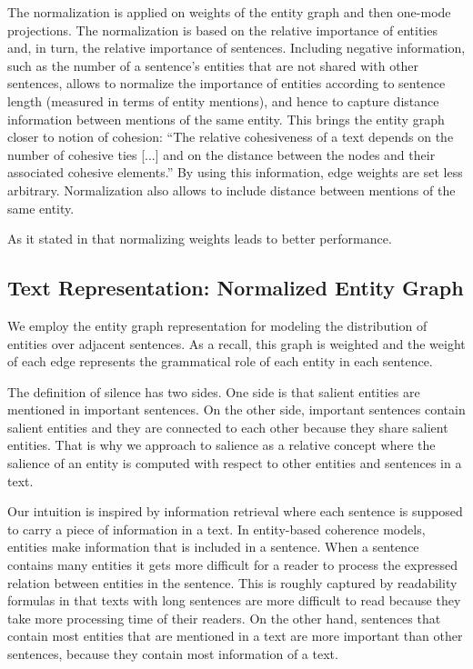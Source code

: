The normalization is applied on weights of the entity graph and then one-mode projections. 
The normalization is based on the relative importance of entities and, in turn, the relative importance of sentences. 
Including negative information, such as the number of a sentence's entities that are not shared with other sentences, allows to normalize the importance of entities according to sentence length (measured in terms
of entity mentions), and hence to capture distance information between mentions of the same entity.
This brings the entity graph closer to  notion of cohesion: ``The relative cohesiveness of a text depends on the number of cohesive ties [...] and on the distance between the nodes and their associated cohesive elements.” By using this information, edge weights are set less arbitrary. 
Normalization also allows to include distance between mentions of the same entity.  

As it stated in \cite{zhoudengyong07,zweig11} that normalizing weights leads to better performance. 

\subsection{Text Representation: Normalized Entity Graph}
%
We employ the entity graph representation for modeling the distribution of entities over adjacent sentences. 
As a recall, this graph is weighted and the weight of each edge represents the grammatical role of each entity in each sentence.  


The definition of silence has two sides. 
One side is that salient entities are mentioned in important sentences.  
On the other side, important sentences contain salient entities and they are connected to each other because they share salient entities. 
That is why we approach to salience as a relative concept where the salience of an entity is computed with respect to other entities and sentences in a text. 

Our intuition is inspired by information retrieval where each sentence is supposed to carry a piece of information in a text. 
In entity-based coherence models, entities make information that is included in a sentence. 
When a sentence contains many entities it gets more difficult for a reader to process the expressed relation between entities in the sentence. 
This is roughly captured by readability formulas in that texts with long sentences are more difficult to read because they take more processing time of their readers. 
On the other hand, sentences that contain most entities that are mentioned in a text are more important than other sentences, because they contain most information of a text. 

